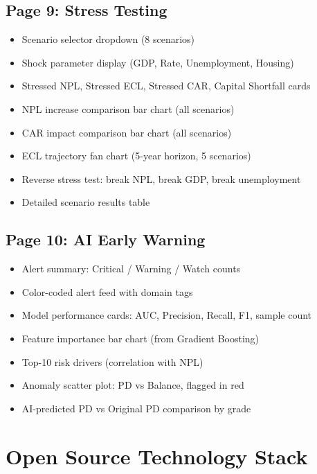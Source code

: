 \documentclass[12pt,a4paper]{article}
\begin{document}
\subsection{Page 9: Stress Testing}

\begin{itemize}
    \item Scenario selector dropdown (8 scenarios)
    \item Shock parameter display (GDP, Rate, Unemployment, Housing)
    \item Stressed NPL, Stressed ECL, Stressed CAR, Capital Shortfall cards
    \item NPL increase comparison bar chart (all scenarios)
    \item CAR impact comparison bar chart (all scenarios)
    \item ECL trajectory fan chart (5-year horizon, 5 scenarios)
    \item Reverse stress test: break NPL, break GDP, break unemployment
    \item Detailed scenario results table
\end{itemize}

\subsection{Page 10: AI Early Warning}

\begin{itemize}
    \item Alert summary: Critical / Warning / Watch counts
    \item Color-coded alert feed with domain tags
    \item Model performance cards: AUC, Precision, Recall, F1, sample count
    \item Feature importance bar chart (from Gradient Boosting)
    \item Top-10 risk drivers (correlation with NPL)
    \item Anomaly scatter plot: PD vs Balance, flagged in red
    \item AI-predicted PD vs Original PD comparison by grade
\end{itemize}

\section{Open Source Technology Stack}
\end{document}
